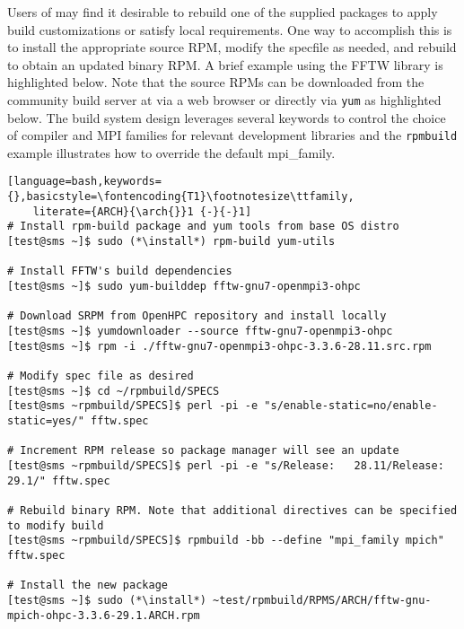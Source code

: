 Users of \OHPC{} may find it desirable to rebuild one of the supplied packages
to apply build customizations or satisfy local requirements. One way to
accomplish this is to install the appropriate source RPM, modify the specfile
as needed, and rebuild to obtain an updated binary RPM. A brief example using
the FFTW library is highlighted below.  Note that the source RPMs can be downloaded from the
community build server at \href{https://build.openhpc.community}
{\color{blue}{https://build.openhpc.community}} via a web browser or directly
via \texttt{yum} as highlighted below. The \OHPC{} build system design
leverages several keywords to control the choice of compiler and MPI families
for relevant development libraries and the \texttt{rpmbuild} example
illustrates how to override the default mpi\_family.

\begin{lstlisting}[language=bash,keywords={},basicstyle=\fontencoding{T1}\footnotesize\ttfamily,
    literate={ARCH}{\arch{}}1 {-}{-}1]
# Install rpm-build package and yum tools from base OS distro
[test@sms ~]$ sudo (*\install*) rpm-build yum-utils

# Install FFTW's build dependencies
[test@sms ~]$ sudo yum-builddep fftw-gnu7-openmpi3-ohpc

# Download SRPM from OpenHPC repository and install locally
[test@sms ~]$ yumdownloader --source fftw-gnu7-openmpi3-ohpc
[test@sms ~]$ rpm -i ./fftw-gnu7-openmpi3-ohpc-3.3.6-28.11.src.rpm

# Modify spec file as desired
[test@sms ~]$ cd ~/rpmbuild/SPECS
[test@sms ~rpmbuild/SPECS]$ perl -pi -e "s/enable-static=no/enable-static=yes/" fftw.spec

# Increment RPM release so package manager will see an update
[test@sms ~rpmbuild/SPECS]$ perl -pi -e "s/Release:   28.11/Release:   29.1/" fftw.spec

# Rebuild binary RPM. Note that additional directives can be specified to modify build
[test@sms ~rpmbuild/SPECS]$ rpmbuild -bb --define "mpi_family mpich" fftw.spec

# Install the new package
[test@sms ~]$ sudo (*\install*) ~test/rpmbuild/RPMS/ARCH/fftw-gnu-mpich-ohpc-3.3.6-29.1.ARCH.rpm
\end{lstlisting}
